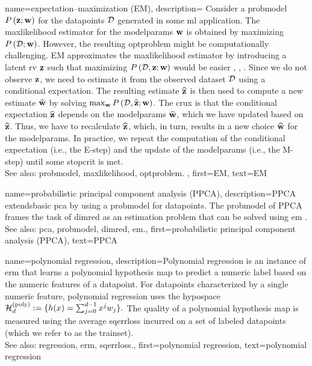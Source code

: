 {name={expectation–maximization (EM)}, 
	description={ 
		Consider a \gls{probmodel} $P\left({\bf z}; {\bf w}\right)$ for the \glspl{datapoint} $\mathcal{D}$ generated in some 
		\gls{ml} application. The \gls{maxlikelihood} estimator for the \glspl{modelparam} ${\bf w}$ is obtained by maximizing 
		$P\left(\mathcal{D}; {\bf w}\right)$. However, the resulting \gls{optproblem} might be computationally 
		challenging. EM approximates the \gls{maxlikelihood} estimator by introducing a latent 
		\gls{rv} ${\bf z}$ such that maximizing $P\left(\mathcal{D},{\bf z}; {\bf w}\right)$ would be easier 
		\cite{hastie01statisticallearning}, \cite{BishopBook}, \cite{GraphModExpFamVarInfWainJor}. Since we 
		do not observe ${\bf z}$, we need to estimate it from the observed \gls{dataset} $\mathcal{D}$ 
		using a conditional \gls{expectation}. The resulting estimate $\widehat{{\bf z}}$ is then used to 
		compute a new estimate $\widehat{{\bf w}}$ by solving $\max_{{\bf w}} P\left(\mathcal{D}, \widehat{{\bf z}}; {\bf w}\right)$. 
		The crux is that the conditional \gls{expectation} $\widehat{{\bf z}}$ depends on the \glspl{modelparam} $\widehat{{\bf w}}$, 
		which we have updated based on $\widehat{{\bf z}}$. Thus, we have to recalculate $\widehat{{\bf z}}$, 
		which, in turn, results in a new choice $\widehat{{\bf w}}$ for the \glspl{modelparam}. In practice, 
		we repeat the computation of the conditional \gls{expectation} (i.e., the E-step) and the update 
		of the \glspl{modelparam} (i.e., the M-step) until some \gls{stopcrit} is met. 
				\\
		See also: \gls{probmodel}, \gls{maxlikelihood}, \gls{optproblem}. },
	first={EM},
	text={EM}
}


{name={probabilistic principal component analysis (PPCA)}, 
	description={PPCA 
		extends\linebreak basic \gls{pca} by using a \gls{probmodel} for \glspl{datapoint}. 
		The \gls{probmodel} of PPCA frames the task of \gls{dimred} 
		as an estimation problem that can be solved using \gls{em} \cite{TippingProbPCA}.
				\\
		See also: \gls{pca}, \gls{probmodel}, \gls{dimred}, \gls{em}.},
	first={probabilistic principal component analysis (PPCA)},
	text={PPCA}
}
	
{name={polynomial regression}, 
	description={Polynomial 
		\gls{regression} is an instance of \gls{erm} that learns a polynomial \gls{hypothesis} 
		\gls{map} to predict a numeric \gls{label} based on the numeric \glspl{feature} of a \gls{datapoint}. 
		 For \glspl{datapoint} characterized by a single numeric \gls{feature}, polynomial \gls{regression} uses the \gls{hypospace} 
		$\mathcal{H}^{(\rm poly)}_{d} := \{ h(x) = \sum_{j=0}^{d-1} x^{j} w_{j} \}.$
		The quality of a polynomial \gls{hypothesis} \gls{map} is measured using the average \gls{sqerrloss} 
		incurred on a set of \glspl{labeled datapoint} (which we refer to as the \gls{trainset}).
					\\
		See also: \gls{regression}, \gls{erm}, \gls{sqerrloss}.},
	first={polynomial regression},
	text={polynomial regression}
}


